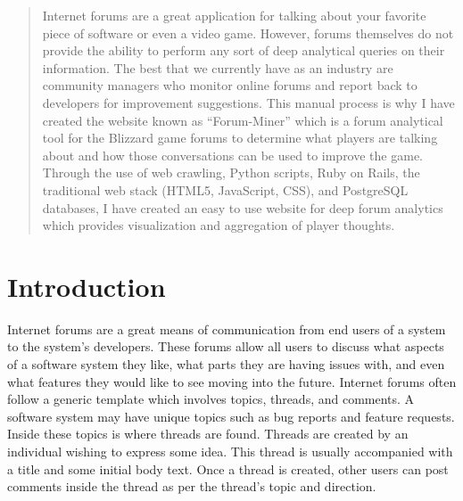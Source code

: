 \documentclass[conference]{IEEEtran}
\begin{document}
\title{}

\author{
}

\maketitle


\begin{abstract}
Internet forums are a great application for talking about your favorite piece of software
or even a video game. However, forums themselves do not provide the ability to perform any sort
of deep analytical queries on their information. The best that we currently have as an industry
are community managers who monitor online forums and report back to developers for improvement
suggestions. This manual process is why I have created the website known as ``Forum-Miner'' which
is a forum analytical tool for the Blizzard game forums to determine what players are talking about
and how those conversations can be used to improve the game. Through the use of web crawling,
Python scripts, Ruby on Rails, the traditional web stack (HTML5, JavaScript, CSS), and PostgreSQL
databases, I have created an easy to use website for deep forum analytics which provides visualization
and aggregation of player thoughts.
\end{abstract}


\section{Introduction}
Internet forums are a great means of communication from end users of a system to the system's
developers. These forums allow all users to discuss what aspects of a software system they like,
what parts they are having issues with, and even what features they would like to see moving into 
the future. Internet forums often follow a generic template which involves topics, threads, and
comments. A software system may have unique topics such as bug reports and feature requests. Inside
these topics is where threads are found. Threads are created by an individual wishing to express
some idea. This thread is usually accompanied with a title and some initial body text. Once a thread
is created, other users can post comments inside the thread as per the thread's topic and direction.
\end{document}
